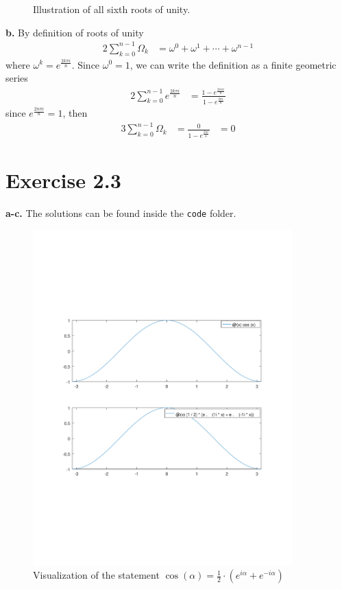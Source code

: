 \documentclass[12pt]{article}
\begin{document}
	\begin{figure}[H]
	\def\n{6}
	\centering
	\caption{Illustration of all sixth roots of unity.}
	\end{figure}
	\textbf{b.} By definition of roots of unity
	\begin{alignat*}{2}
		\sum_{k = 0}^{n-1}\Omega_k &= \omega^0 + \omega^1 + \cdots + \omega^{n-1}
	\end{alignat*}
	where $\omega^k = e^{\frac{2 k \pi i}{n}}$. Since $\omega^0 = 1$, we can write the definition as a finite geometric series
	\begin{alignat*}{2}
	\sum_{k = 0}^{n-1} e^{\frac{2 k \pi i}{n}}&= \frac{1 - e^{\frac{2 n \pi i}{n}}}{1 - e^{\frac{2\pi i}{n}}}
	\end{alignat*}
	since $e^{\frac{2 n \pi i}{n}} = 1$, then 
	\begin{alignat*}{3}
	\sum_{k = 0}^{n-1} \Omega_k &= \frac{0}{1 - e^{\frac{2\pi i}{n}}} &= 0
	\end{alignat*}
	\section*{Exercise 2.3}
	\textbf{a-c.} The solutions can be found inside the \texttt{code} folder.
	\begin{figure}[H]
	\label{plot}
	\centering
	\includegraphics[width=27em]{3c.pdf}
	\caption{Visualization of the statement $\cos(\alpha) = \frac{1}{2} \cdot (e^{i\alpha} + e^{-i\alpha})$ }
	\end{figure}
\end{document}
